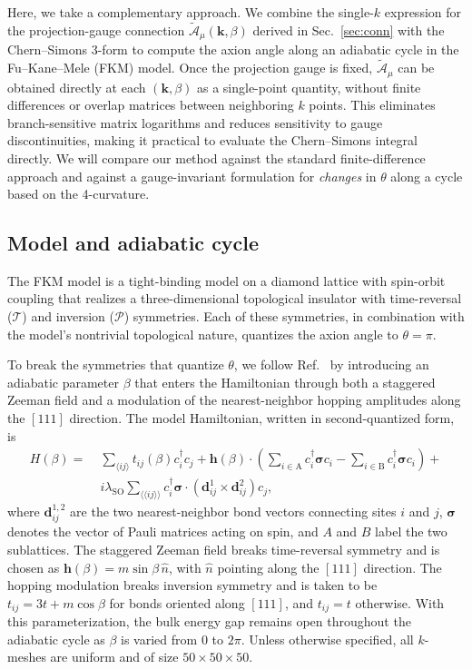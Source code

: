 \documentclass[galley,aps,pra,10pt,amsmath,amssymb,
    superscriptaddress,nofootinbib,longbibliography]{revtex4-2}
\begin{document}
Here, we take a complementary approach. We combine the single-$k$ expression for the projection-gauge connection $\tilde{\mathcal{A}}_\mu(\mathbf{k}, \beta)$ derived in Sec.~\ref{sec:conn} with the Chern--Simons 3-form to compute the axion angle along an adiabatic cycle in the Fu--Kane--Mele (FKM) model. Once the projection gauge is fixed, $\tilde{\mathcal{A}}_\mu$ can be obtained directly at each $(\mathbf{k}, \beta)$ as a single-point quantity, without finite differences or overlap matrices between neighboring $k$ points. This eliminates branch-sensitive matrix logarithms and reduces sensitivity to gauge discontinuities, making it practical to evaluate the Chern--Simons integral directly. We will compare our method against the standard finite-difference approach and against a gauge-invariant formulation for \emph{changes} in $\theta$ along a cycle based on the 4-curvature.


\subsection{Model and adiabatic cycle}

The FKM model is a tight-binding model on a diamond lattice with spin-orbit coupling that realizes a three-dimensional topological insulator with time-reversal ($\mathcal{T}$) and inversion ($\mathcal{P}$) symmetries. Each of these symmetries, in combination with the model's nontrivial topological nature, quantizes the axion angle to $\theta=\pi$. 

To break the symmetries that quantize $\theta$, we follow Ref.~\cite{essin2010orbital} by introducing an adiabatic parameter $\beta$ that enters the Hamiltonian through both a staggered Zeeman field and a modulation of the nearest-neighbor hopping amplitudes along the $[111]$ direction. The model Hamiltonian, written in second-quantized form, is 
\begin{align}
\label{eq:FKM_H}
H(\beta) =  \; &  \sum_{\langle ij \rangle} t_{ij}(\beta) c_i^{\dagger} c_j
+ \mathbf{h}(\beta) \cdot \left( \sum_{i \in \text{A}} c_i^\dagger \mathbf{\sigma} c_i  - \sum_{i \in \text{B}} c_i^\dagger \mathbf{\sigma} c_i \right) +\\ & \nonumber i\lambda_{\text{SO}}\sum_{\langle\langle ij \rangle\rangle} c_i^{\dagger} \boldsymbol{\sigma} \cdot (\mathbf{d}_{ij}^{1} \times \mathbf{d}_{ij}^{2}) c_j  ,
\end{align}
where $\mathbf{d}_{ij}^{1,2}$ are the two nearest-neighbor bond vectors connecting sites $i$ and $j$, $\boldsymbol{\sigma}$ denotes the vector of Pauli matrices acting on spin, and $A$ and $B$ label the two sublattices. The staggered Zeeman field breaks time-reversal symmetry and is chosen as $\mathbf{h}(\beta)= m\sin\beta\, \hat{n}$, with $\hat{n}$ pointing along the $[111]$ direction. The hopping modulation breaks inversion symmetry and is taken to be $t_{ij} = 3t+m\cos\beta$ for bonds oriented along $[111]$, and $t_{ij}=t$ otherwise. With this parameterization, the bulk energy gap remains open throughout the adiabatic cycle as $\beta$ is varied from $0$ to $2\pi$. Unless otherwise specified, all $k$-meshes are uniform and of size $ 50 \times 50 \times 50$.
\end{document}
